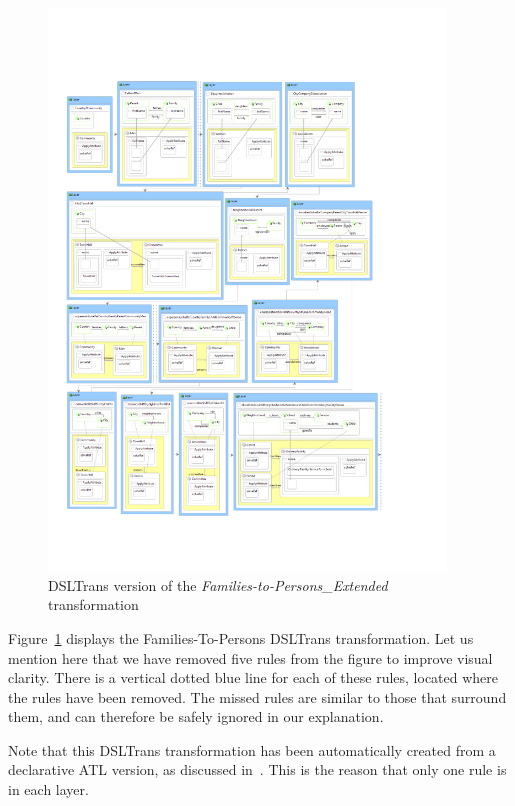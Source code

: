 \begin{figure}
  \begin{center}
  \includegraphics[width=0.94\textwidth]{figures/FamToPersons/DSLTrans_Rules_javi}
  \caption{DSLTrans version of the \emph{Families-to-Persons\_Extended} transformation}
  \label{fig:DSLTrans_rules}
  \end{center}
\end{figure}


Figure~\ref{fig:DSLTrans_rules} displays the Families-To-Persons DSLTrans transformation. Let us mention here that we have removed five rules from the figure to improve visual clarity.
There is a vertical dotted blue line for each of these rules, located where the rules have been removed. The missed rules are similar to those that surround them, and can therefore be safely ignored in our explanation.

Note that this DSLTrans transformation has been automatically created from a declarative ATL version, as discussed in~\cite{Oakes2016}. This is the reason that only one rule is in each layer.

